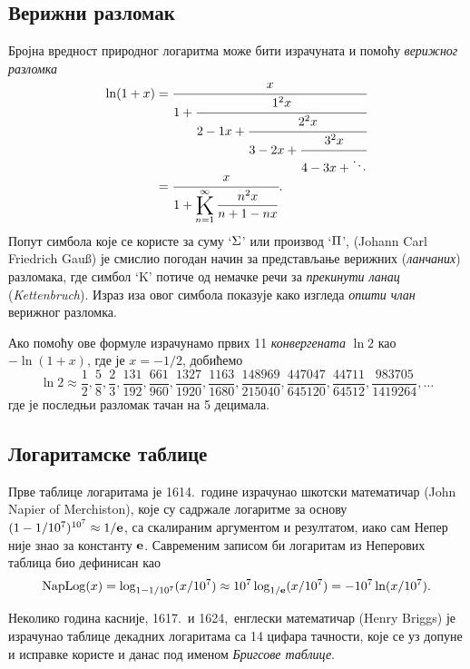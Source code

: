 \subsection{Верижни разломак}

Бројна вредност природног логаритма може бити израчуната и помоћу {\sl верижног разломка}
\begin{equation}\label{eq:verige}
\begin{aligned}
\noalign{\vskip-6pt}
\ln(1+x)
&=\cfrac{x}{1+\cfrac{1^2x}{2-1x+\cfrac{2^2x}{3-2x+\cfrac{3^2x}{4-3x+\ddots}}}}\\
\noalign{\vskip-6pt}
&=\cfrac{x}{1+ \Kinf{\n^2x}{\n+1-\n x}}.
\end{aligned}
\end{equation}
Попут симбола које се користе за суму `$\rm\Sigma$' или производ `$\rm\Pi$', 
 (Johann Carl Friedrich Gau\ss) је смислио погодан начин за представљање
верижних ({\sl ланчаних\/}) разломака,
где симбол `K' потиче од немачке речи за {\sl прекинути ланац\/} ({\sl Kettenbruch\/}).
Израз иза овог симбола показује како изгледа {\sl општи члан\/} верижног разломка.

\def\ff#1/#2,{\frac{#1}{#2},}
Ако помоћу ове формуле израчунамо првих 11 {\sl конвергената\/} $\ln2$ као $-\ln(1+x)$, 
где је $x=-1/2$,
добићемо
$$
\ln2\approx\ff1/2, \ff5/8, \ff2/3, \ff131/192, \ff661/960, \ff1327/1920, \ff1163/1680, \ff148969/215040, 
\ff447047/645120, \ff44711/64512, \ff983705/1419264, \dots
$$
где је последњи разломак тачан на 5 децимала.


\subsection{Логаритамске таблице}

Прве таблице логаритама је 1614.\ године 
израчунао шкотски математичар  (John Napier of Merchiston),
које су садржале логаритме за основу $(1-1/10^7)^{10^7} \approx1/{\bf e}$, 
са скалираним аргументом и резултатом,
иако сам Непер није знао за константу ${\bf e}$.
Савременим записом би логаритам из Неперових таблица био дефинисан као
$$
\mathop{\rm NapLog}\nolimits (x) = \log_{1-1/10^7}(x/10^7)
\approx 10^7\log_{1/{\bf e}}(x/10^7) = -10^7\ln(x/10^7).
$$

Неколико година касније, 1617.\ и 1624,\ 
енглески математичар  (Henry Briggs) је израчунао
таблице декадних логаритама са 14 цифара тачности, које се уз допуне и исправке
користе и данас под именом {\sl Бригсове таблице}.


